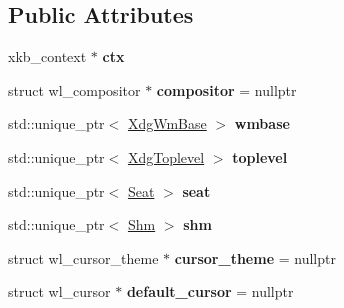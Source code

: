 \subsection*{Public Attributes}
\begin{DoxyCompactItemize}
\item 
\mbox{\label{classwlwin_1_1WlWindow_a54219565a1b620d18b4ebe093c936953}} 
xkb\+\_\+context $\ast$ {\bfseries ctx}
\item 
\mbox{\label{classwlwin_1_1WlWindow_a2c8212e34baf7f64720a4f6b99426051}} 
struct wl\+\_\+compositor $\ast$ {\bfseries compositor} = nullptr
\item 
\mbox{\label{classwlwin_1_1WlWindow_ac0f64808e87fc09adbb04b658e510f07}} 
std\+::unique\+\_\+ptr$<$ \mbox{\hyperlink{classwlwin_1_1XdgWmBase}{Xdg\+Wm\+Base}} $>$ {\bfseries wmbase}
\item 
\mbox{\label{classwlwin_1_1WlWindow_ac1ccef54944dc554d4e184f5a7c38743}} 
std\+::unique\+\_\+ptr$<$ \mbox{\hyperlink{classwlwin_1_1XdgToplevel}{Xdg\+Toplevel}} $>$ {\bfseries toplevel}
\item 
\mbox{\label{classwlwin_1_1WlWindow_adec9ccf65263a42341f37495363b755d}} 
std\+::unique\+\_\+ptr$<$ \mbox{\hyperlink{classwlwin_1_1Seat}{Seat}} $>$ {\bfseries seat}
\item 
\mbox{\label{classwlwin_1_1WlWindow_a92ca82136341a4488de1f1590b49fabd}} 
std\+::unique\+\_\+ptr$<$ \mbox{\hyperlink{classwlwin_1_1Shm}{Shm}} $>$ {\bfseries shm}
\item 
\mbox{\label{classwlwin_1_1WlWindow_a87a4fcb0fe7d1fed57a3e9dcf0070b0d}} 
struct wl\+\_\+cursor\+\_\+theme $\ast$ {\bfseries cursor\+\_\+theme} = nullptr
\item 
\mbox{\label{classwlwin_1_1WlWindow_a305e0cb019e8bb67e84d85dcdfe22bf1}} 
struct wl\+\_\+cursor $\ast$ {\bfseries default\+\_\+cursor} = nullptr
\item 
\mbox{\label{classwlwin_1_1WlWindow_a3fff0c71a3fd4e676271aaeffccb28c8}} 

\end{DoxyCompactItemize}
